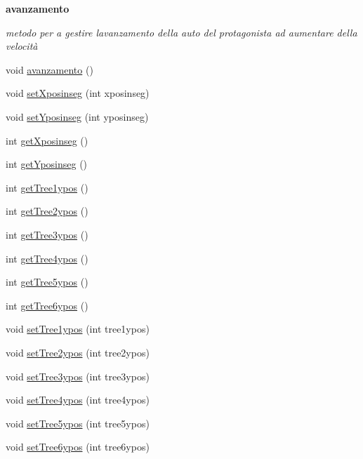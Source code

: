 \begin{Indent}\textbf{ avanzamento}\par
{\em metodo per a gestire l\textquotesingle{}avanzamento della auto del protagonista ad aumentare della velocità }\begin{DoxyCompactItemize}
\item 
void \hyperlink{classcargame_1_1condivisa_a93b971884ca2e884143dbb35744cb6f0}{avanzamento} ()
\item 
void \hyperlink{classcargame_1_1condivisa_a7fc9e9753bb8c6f8023ab94ef56744a6}{set\+Xposinseg} (int xposinseg)
\item 
void \hyperlink{classcargame_1_1condivisa_a4bc9cdd1344461ced99ee1bfc9049bea}{set\+Yposinseg} (int yposinseg)
\item 
int \hyperlink{classcargame_1_1condivisa_a97e507b46357fcce6770312f772fc347}{get\+Xposinseg} ()
\item 
int \hyperlink{classcargame_1_1condivisa_a0db1c898200d64b881a2657712f72e40}{get\+Yposinseg} ()
\item 
int \hyperlink{classcargame_1_1condivisa_a356433543b0604c02ccbd5517dac4353}{get\+Tree1ypos} ()
\item 
int \hyperlink{classcargame_1_1condivisa_a76c90994208b1d3e48135a8ab702bbac}{get\+Tree2ypos} ()
\item 
int \hyperlink{classcargame_1_1condivisa_aca8c6ef62d607dc011069ec395602291}{get\+Tree3ypos} ()
\item 
int \hyperlink{classcargame_1_1condivisa_a361cfa46d2af12ba2dd71c919c963b1a}{get\+Tree4ypos} ()
\item 
int \hyperlink{classcargame_1_1condivisa_ab04fb0bbd43e196f4ce5f693ceeef61d}{get\+Tree5ypos} ()
\item 
int \hyperlink{classcargame_1_1condivisa_ae5ed8de123a8342b0b263a6edce54e96}{get\+Tree6ypos} ()
\item 
void \hyperlink{classcargame_1_1condivisa_a8ef6dcab42d241a285e397ac0734cf75}{set\+Tree1ypos} (int tree1ypos)
\item 
void \hyperlink{classcargame_1_1condivisa_a9c27a4ce9c3d7df4eb427e695f150c98}{set\+Tree2ypos} (int tree2ypos)
\item 
void \hyperlink{classcargame_1_1condivisa_ad44cf98ca5b583b9611c581ccd26874a}{set\+Tree3ypos} (int tree3ypos)
\item 
void \hyperlink{classcargame_1_1condivisa_a27a081c3460dfa87ba577e3f0c24ee06}{set\+Tree4ypos} (int tree4ypos)
\item 
void \hyperlink{classcargame_1_1condivisa_aae978adead4d57b9ce11294fe9f06803}{set\+Tree5ypos} (int tree5ypos)
\item 
void \hyperlink{classcargame_1_1condivisa_ad0b9d3bbd4a7b0852f8fb84aaa101697}{set\+Tree6ypos} (int tree6ypos)
\end{DoxyCompactItemize}
\end{Indent}
